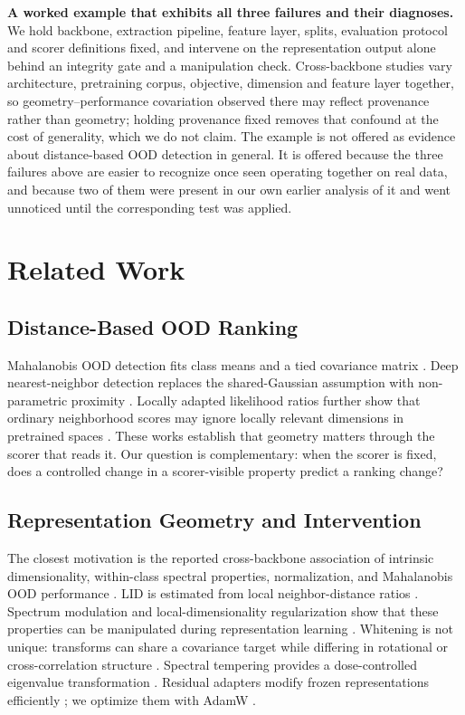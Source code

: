 \documentclass[11pt,a4paper]{article}
\begin{document}
\textbf{A worked example that exhibits all three failures and their
diagnoses.} We hold backbone, extraction pipeline, feature layer, splits,
evaluation protocol and scorer definitions fixed, and intervene on the
representation output alone behind an integrity gate and a manipulation check.
Cross-backbone studies vary architecture, pretraining corpus, objective,
dimension and feature layer together, so geometry--performance covariation
observed there may reflect provenance rather than geometry; holding provenance
fixed removes that confound at the cost of generality, which we do not claim.
The example is not offered as evidence about distance-based OOD detection in
general. It is offered because the three failures above are easier to recognize
once seen operating together on real data, and because two of them were present
in our own earlier analysis of it and went unnoticed until the corresponding
test was applied.

\section{Related Work}
\subsection{Distance-Based OOD Ranking}
Mahalanobis OOD detection fits class means and a tied covariance matrix \cite{b1}. Deep nearest-neighbor detection replaces the shared-Gaussian assumption with non-parametric proximity \cite{b2}. Locally adapted likelihood ratios further show that ordinary neighborhood scores may ignore locally relevant dimensions in pretrained spaces \cite{b3}. These works establish that geometry matters through the scorer that reads it. Our question is complementary: when the scorer is fixed, does a controlled change in a scorer-visible property predict a ranking change?

\subsection{Representation Geometry and Intervention}
The closest motivation is the reported cross-backbone association of intrinsic dimensionality, within-class spectral properties, normalization, and Mahalanobis OOD performance \cite{b4}. LID is estimated from local neighbor-distance ratios \cite{b5}. Spectrum modulation and local-dimensionality regularization show that these properties can be manipulated during representation learning \cite{b6,b7}. Whitening is not unique: transforms can share a covariance target while differing in rotational or cross-correlation structure \cite{b8}. Spectral tempering provides a dose-controlled eigenvalue transformation \cite{b9}. Residual adapters modify frozen representations efficiently \cite{b10}; we optimize them with AdamW \cite{b11}.
\end{document}
